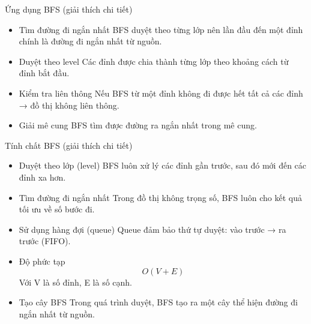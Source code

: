 \documentclass{beamer}
\newcommand{\hlblue}[1]{\textcolor{myblue}{#1}}
\newcommand{\hlgreen}[1]{\textcolor{mygreen}{#1}}
\newcommand{\hlred}[1]{\textcolor{myred}{#1}}
\newcommand{\hlpurple}[1]{\textcolor{mypurple}{#1}}
\newcommand{\hlorange}[1]{\textcolor{myorange}{#1}}
\begin{document}
\begin{frame}{Ứng dụng BFS (giải thích chi tiết)}

\begin{itemize}

\item \hlblue{Tìm đường đi ngắn nhất}  
BFS duyệt theo từng lớp nên lần đầu đến một đỉnh chính là đường đi ngắn nhất từ nguồn.

\vspace{5pt}

\item \hlgreen{Duyệt theo level}  
Các đỉnh được chia thành từng lớp theo khoảng cách từ đỉnh bắt đầu.

\vspace{5pt}

\item \hlpurple{Kiểm tra liên thông}  
Nếu BFS từ một đỉnh không đi được hết tất cả các đỉnh → đồ thị không liên thông.

\vspace{5pt}

\item \hlorange{Giải mê cung}  
BFS tìm được đường ra ngắn nhất trong mê cung.

\end{itemize}

\end{frame}

\begin{frame}{Tính chất BFS (giải thích chi tiết)}

\begin{itemize}

\item \hlblue{Duyệt theo lớp (level)}  
BFS luôn xử lý các đỉnh gần trước, sau đó mới đến các đỉnh xa hơn.

\vspace{5pt}

\item \hlgreen{Tìm đường đi ngắn nhất}  
Trong đồ thị không trọng số, BFS luôn cho kết quả tối ưu về số bước đi.

\vspace{5pt}

\item \hlpurple{Sử dụng hàng đợi (queue)}  
Queue đảm bảo thứ tự duyệt: vào trước → ra trước (FIFO).

\vspace{5pt}

\item \hlred{Độ phức tạp}  
\[
O(V + E)
\]
Với V là số đỉnh, E là số cạnh.

\vspace{5pt}

\item \hlorange{Tạo cây BFS}  
Trong quá trình duyệt, BFS tạo ra một cây thể hiện đường đi ngắn nhất từ nguồn.

\end{itemize}

\end{frame}
\end{document}
